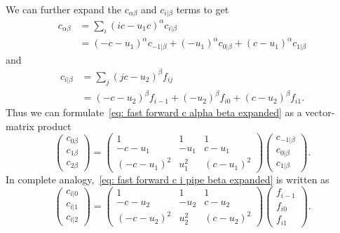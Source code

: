 We can further expand the $c_{\alpha\beta}$ and $c_{i|\beta}$ terms to get
\begin{equation}
  \begin{aligned}
    \label{eq: fast forward c alpha beta expanded}
    c_{\alpha\beta} & = \sum_{i} {\left(ic-u_1 c\right)}^\alpha c_{i|\beta} \\
    & = {\left(-c-u_1\right)}^\alpha c_{-1|\beta} + {\left(-u_1\right)}^\alpha c_{0|\beta} + {\left(c-u_1\right)}^\alpha c_{1|\beta}
  \end{aligned}
\end{equation}
and
\begin{equation}
  \begin{aligned}
    \label{eq: fast forward c i pipe beta expanded}
    c_{i|\beta} & = \sum_{j} {\left(jc-u_2\right)}^\beta f_{ij} \\
    & = {\left(-c-u_2\right)}^\beta f_{i-1} + {\left(-u_2\right)}^\beta f_{i0} + {\left(c-u_2\right)}^\beta f_{i1}.
  \end{aligned}
\end{equation}
Thus we can formulate~\eqref{eq: fast forward c alpha beta expanded} as a vector-matrix product
\begin{equation}
  \label{eq: fast forward c alpha beta matrix}
  \begin{pmatrix}
    c_{0\beta} \\
    c_{1\beta} \\
    c_{2\beta}
  \end{pmatrix}
  =
  \begin{pmatrix}
    1 & 1 & 1 \\
    -c-u_1 & - u_1 & c-u_1 \\
    {\left(-c - u_1\right)}^2 & u_1^2 & {\left(c- u_1\right)}^2
  \end{pmatrix}
  \begin{pmatrix}
    c_{-1|\beta} \\
    c_{0|\beta} \\
    c_{1|\beta}
  \end{pmatrix}.
\end{equation}
In complete analogy,~\eqref{eq: fast forward c i pipe beta expanded} is written as
\begin{equation}
  \label{eq:fast forward c i pipe beta matrix}
  \begin{pmatrix}
    c_{i|0} \\
    c_{i|1} \\
    c_{i|2}
  \end{pmatrix}
  =
  \begin{pmatrix}
    1 & 1 & 1 \\
    -c- u_2 & -  u_2 &   c- u_2 \\
    {\left(-c- u_2\right)}^2 & u_2^2 &  {\left(c- u_2\right)}^2
  \end{pmatrix}
  \begin{pmatrix}
    f_{i-1} \\
    f_{i0} \\
    f_{i1}
  \end{pmatrix}.
\end{equation}

